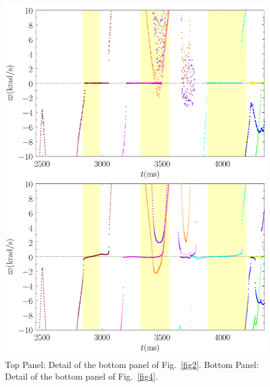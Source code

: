 \documentclass[12pt,prb,aps]{revtex4-1}
\begin{document}
\begin{figure}
\includegraphics[height=6in]{fig6.pdf}
\caption{Top Panel: Detail of the bottom panel of Fig.~\ref{fig2}. Bottom Panel: Detail of the bottom panel of Fig.~\ref{fig4}. } \label{fig6}
\end{figure}
\end{document}
